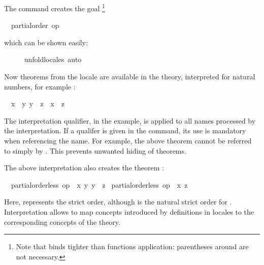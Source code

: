 \begin{isabellebody}
\begin{isamarkuptxt}
  The command creates the goal%
\footnote{Note that  binds tighter than functions
  application: parentheses around  are not necessary.}
  \begin{isabelle}%
\ {}{\isachardot}\ partial{\isacharunderscore}order\ op\ {\isasymle}%
\end{isabelle} which can be shown easily:%
\end{isamarkuptxt}%
\isamarkuptrue%
\ \ \ \ \isamarkupfalse%
\ unfold{\isacharunderscore}locales\ auto%
\endisatagvisible
{\isafoldvisible}%
%
\isadelimvisible
%
\endisadelimvisible
%
\begin{isamarkuptext}%
Now theorems from the locale are available in the theory,
  interpreted for natural numbers, for example : \begin{isabelle}%
\ \ {\isasymlbrakk}{\isacharquery}x\ {\isasymle}\ {\isacharquery}y{\isacharsemicolon}\ {\isacharquery}y\ {\isasymle}\ {\isacharquery}z{\isasymrbrakk}\ {\isasymLongrightarrow}\ {\isacharquery}x\ {\isasymle}\ {\isacharquery}z%
\end{isabelle}

  The interpretation qualifier,  in the example, is applied
  to all names processed by the interpretation.  If a qualifer is
  given in the  command, its use is
  mandatory when referencing the name.  For example, the above theorem
  cannot be referred to simply by .  This prevents
  unwanted hiding of theorems.%
\end{isamarkuptext}%
\isamarkuptrue%
%
\isamarkuptrue%
%
\begin{isamarkuptext}%
The above interpretation also creates the theorem
  : \begin{isabelle}%
\ \ {\isasymlbrakk}partial{\isacharunderscore}order{\isachardot}less\ op\ {\isasymle}\ {\isacharquery}x\ {\isacharquery}y{\isacharsemicolon}\ {\isacharquery}y\ {\isasymle}\ {\isacharquery}z{\isasymrbrakk}\isanewline
\isaindent{\ \ }{\isasymLongrightarrow}\ partial{\isacharunderscore}order{\isachardot}less\ op\ {\isasymle}\ {\isacharquery}x\ {\isacharquery}z%
\end{isabelle}
  Here, 
  represents the strict order, although \isa{{\isacharless}} is the natural
  strict order for .  Interpretation allows to map concepts
  introduced by definitions in locales to the corresponding
  concepts of the theory.%
\end{isamarkuptext}%
\isamarkuptrue%
%
\isadelimtheory
%
\endisadelimtheory
%
\isatagtheory
{}\isamarkupfalse%
%
\endisatagtheory
{\isafoldtheory}%
%
\isadelimtheory
%
\endisadelimtheory
\isanewline
\end{isabellebody}%
